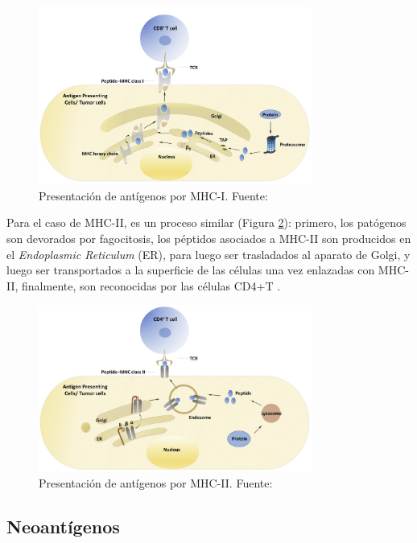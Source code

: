 \begin{figure}[H]
	\centering
	\includegraphics[width=0.8\textwidth]{../img/neoantigen/mhc1.jpg}
	\caption{Presentación de antígenos por MHC-I. Fuente: \cite{zhang2019application}}
	\label{fig:mhc1}
\end{figure}

Para el caso de MHC-II, es un proceso similar (Figura \ref{fig:mhc2}): primero, los patógenos son devorados por fagocitosis, los péptidos asociados a MHC-II son producidos en el \textit{Endoplasmic Reticulum} (ER), para luego ser trasladados al aparato de Golgi, y luego ser transportados a la superficie de las células una vez enlazadas con MHC-II, finalmente, son reconocidas por las células CD4+T \citep{zhang2019application}.



\begin{figure}[H]
	\centering
	\includegraphics[width=0.8\textwidth]{../img/neoantigen/mhc2.jpg}
	\caption{Presentación de antígenos por MHC-II. Fuente: \cite{zhang2019application}}
	\label{fig:mhc2}
\end{figure}

\subsection{Neoantígenos}

